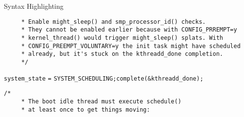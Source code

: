 \begin{frame}{Syntax Highlighting}
\begin{verbatim}
	 * Enable might_sleep() and smp_processor_id() checks.
	 * They cannot be enabled earlier because with CONFIG_PRREMPT=y
	 * kernel_thread() would trigger might_sleep() splats. With
	 * CONFIG_PREEMPT_VOLUNTARY=y the init task might have scheduled
	 * already, but it's stuck on the kthreadd_done completion.
	 */\end{verbatim}\leavevmode\newline\tab\color{Aquamarine}\verb$system_state$ \color{Fuchsia}\verb$=$ \color{Aquamarine}\verb$SYSTEM_SCHEDULING$\color{Fuchsia}\verb$;$\newline\newline\tab\color{Aquamarine}\verb$complete$\color{Fuchsia}\verb$($\color{Goldenrod}\verb$&$\color{Aquamarine}\verb$kthreadd_done$\color{Fuchsia}\verb$)$\color{Fuchsia}\verb$;$\newline\newline\tab\color{Rhodamine}\begin{verbatim}/*
	 * The boot idle thread must execute schedule()
	 * at least once to get things moving:

\end{verbatim}
\end{frame}
